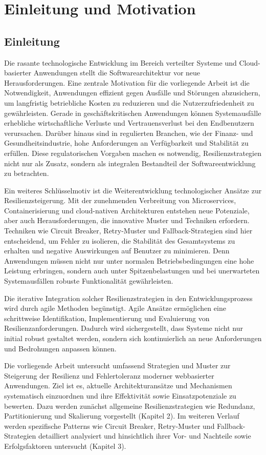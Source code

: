 \section{Einleitung und Motivation}

\subsection*{Einleitung}


Die rasante technologische Entwicklung im Bereich verteilter Systeme und Cloud-basierter Anwendungen stellt
die Softwarearchitektur vor neue Herausforderungen.
Eine zentrale Motivation für die vorliegende Arbeit ist die Notwendigkeit, Anwendungen effizient gegen
Ausfälle und Störungen abzusichern, um langfristig betriebliche Kosten zu reduzieren und die Nutzerzufriedenheit
zu gewährleisten.
Gerade in geschäftskritischen Anwendungen können Systemausfälle erhebliche wirtschaftliche Verluste und
Vertrauensverlust bei den Endbenutzern verursachen.
Darüber hinaus sind in regulierten Branchen, wie der Finanz- und Gesundheitsindustrie,
hohe Anforderungen an Verfügbarkeit und Stabilität zu erfüllen.
Diese regulatorischen Vorgaben machen es notwendig, Resilienzstrategien nicht nur als Zusatz,
sondern als integralen Bestandteil der Softwareentwicklung zu betrachten.

Ein weiteres Schlüsselmotiv ist die Weiterentwicklung technologischer Ansätze zur Resilienzsteigerung.
Mit der zunehmenden Verbreitung von Microservices, Containerisierung und cloud-nativen Architekturen
entstehen neue Potenziale, aber auch Herausforderungen, die innovative Muster und Techniken erfordern.
Techniken wie Circuit Breaker, Retry-Muster und Fallback-Strategien sind hier entscheidend, um Fehler zu isolieren,
die Stabilität des Gesamtsystems zu erhalten und negative Auswirkungen auf Benutzer zu minimieren.
Denn Anwendungen müssen nicht nur unter normalen Betriebsbedingungen eine hohe Leistung erbringen,
sondern auch unter Spitzenbelastungen und bei unerwarteten Systemausfällen robuste Funktionalität gewährleisten.


Die iterative Integration solcher Resilienzstrategien in den Entwicklungsprozess wird durch agile Methoden begünstigt.
Agile Ansätze ermöglichen eine schrittweise Identifikation, Implementierung und Evaluierung von Resilienzanforderungen.
Dadurch wird sichergestellt, dass Systeme nicht nur initial robust gestaltet werden,
sondern sich kontinuierlich an neue Anforderungen und Bedrohungen anpassen können.


Die vorliegende Arbeit untersucht umfassend Strategien und Muster zur Steigerung der Resilienz
und Fehlertoleranz moderner webbasierter Anwendungen.
Ziel ist es, aktuelle Architekturansätze und Mechanismen systematisch einzuordnen und ihre Effektivität sowie
Einsatzpotenziale zu bewerten.
Dazu werden zunächst allgemeine Resilienzstrategien wie Redundanz, Partitionierung und Skalierung vorgestellt (Kapitel 2).
Im weiteren Verlauf werden spezifische Patterns wie Circuit Breaker, Retry-Muster und Fallback-Strategien detailliert
analysiert und hinsichtlich ihrer Vor- und Nachteile sowie Erfolgsfaktoren untersucht (Kapitel 3).


